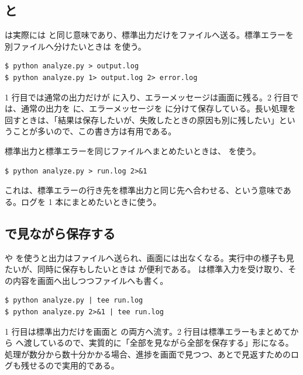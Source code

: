 \subsection{ と }

\code{>} は実際には  と同じ意味であり、標準出力だけをファイルへ送る。標準エラーを別ファイルへ分けたいときは  を使う。

\begin{lstlisting}[numbers=none, xleftmargin=2\zw]
$ python analyze.py > output.log
$ python analyze.py 1> output.log 2> error.log
\end{lstlisting}

1 行目では通常の出力だけが  に入り、エラーメッセージは画面に残る。2 行目では、通常の出力を  に、エラーメッセージを  に分けて保存している。長い処理を回すときは、「結果は保存したいが、失敗したときの原因も別に残したい」ということが多いので、この書き方は有用である。

標準出力と標準エラーを同じファイルへまとめたいときは、 を使う。

\begin{lstlisting}[numbers=none, xleftmargin=2\zw]
$ python analyze.py > run.log 2>&1
\end{lstlisting}

これは、標準エラーの行き先を標準出力と同じ先へ合わせる、という意味である。ログを 1 本にまとめたいときに使う。

\subsection{ で見ながら保存する}

\code{>} や \code{>>} を使うと出力はファイルへ送られ、画面には出なくなる。実行中の様子も見たいが、同時に保存もしたいときは  が便利である。 は標準入力を受け取り、その内容を画面へ出しつつファイルへも書く。

\begin{lstlisting}[numbers=none, xleftmargin=2\zw]
$ python analyze.py | tee run.log
$ python analyze.py 2>&1 | tee run.log
\end{lstlisting}

1 行目は標準出力だけを画面と  の両方へ流す。2 行目は標準エラーもまとめてから  へ渡しているので、実質的に「全部を見ながら全部を保存する」形になる。処理が数分から数十分かかる場合、進捗を画面で見つつ、あとで見返すためのログも残せるので実用的である。

